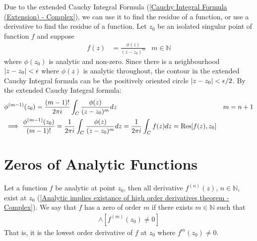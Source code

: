 \documentclass[12pt, english]{book}
\begin{document}
	\begin{example} 
		Due to the extended Cauchy Integral Formula (\cref{Cauchy Integral Formula (Extension) - Complex}), we can use it to find the residue of a function, or use a derivative to find the residue of a function. Let \(z_0\) be an isolated singular point of function \(f\) and suppose
		\begin{align*}
			f(z) &= \frac{\phi(z)}{(z-z_0)^m}	& 	m \in \mathbb{N}
		\end{align*}
		where \(\phi(z_0)\) is analytic and non-zero. Since there is a neighbourhood \(\abs{z-z_0}<\epsilon\) where \(\phi(z)\) is analytic throughout, the contour in the extended Cauchy Integral formula can be the positively oriented circle \(\abs{z-z_0}< \epsilon/2\). By the extended Cauchy Integral formula:
		\begin{align*}
			&\phi^{(m-1)}(z_0) = \frac{(m-1)!}{2\pi i} \int_{C} \frac{\phi(z)}{(z-z_0)^m} dz 	& m=n+1\\
			&\implies \frac{\phi^{(m-1)}(z_0)}{(m-1)!} 
				= \frac{1}{2\pi i} \int_{C} \frac{\phi(z)}{(z-z_0)^{m}} dz
				= \frac{1}{2\pi i} \int_{C} f(z) dz
				= \Res[f(z),z_0]
		\end{align*}
	\end{example}

	\section{Zeros of Analytic Functions} \label{Zeros of Analytic Functions Section - Complex}
	
	\begin{definition}
		\label{Zero of Order m Definition - Complex}
		Let a function \(f\) be analytic at point \(z_0\), then all derivative \(f^{(n)}(z)\), \(n\in \mathbb{N}\), exist at \(z_0\) (\cref{Analytic implies existance of high order derivatives theorem - Complex}). We say that \(f\) has a zero of order \(m\) if there exists \(m\in \mathbb{N}\) such that 
		\begin{align*}
			[f(z_0) = f'(z_0) = f''(z_0) = \cdots = f^{(m-1)}(z_0) = 0] 
			\land [f^{(m)}(z_0) \neq 0]
		\end{align*}
		That is, it is the lowest order derivative of \(f\) at \(z_0\) where \(f^{m}(z_0) \neq 0\).
	\end{definition}
\end{document}

